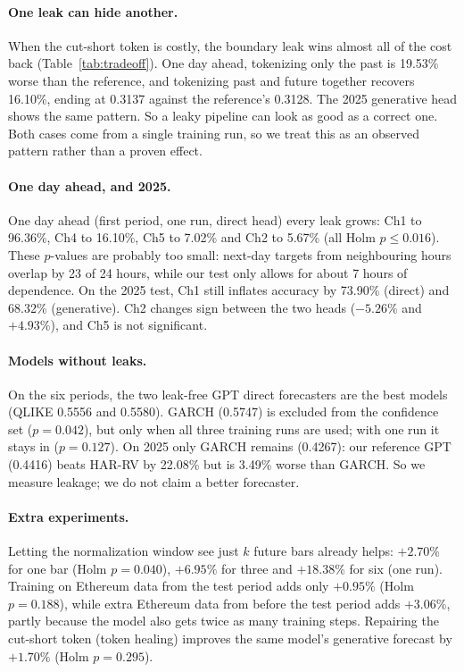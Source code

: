 \documentclass{article}
\begin{document}
\paragraph{One leak can hide another.}
When the cut-short token is costly, the boundary leak wins almost all of the cost back
(Table~\ref{tab:tradeoff}). One day ahead, tokenizing only the past is 19.53\% worse than the
reference, and tokenizing past and future together recovers 16.10\%, ending at 0.3137 against the
reference's 0.3128. The 2025 generative head shows the same pattern. So a leaky pipeline can look as
good as a correct one. Both cases come from a single training run, so we treat this as an observed
pattern rather than a proven effect.

\paragraph{One day ahead, and 2025.}
One day ahead (first period, one run, direct head) every leak grows: Ch1 to 96.36\%, Ch4 to 16.10\%,
Ch5 to 7.02\% and Ch2 to 5.67\% (all Holm $p \le 0.016$). These $p$-values are probably too small:
next-day targets from neighbouring hours overlap by 23 of 24 hours, while our test only allows for
about 7 hours of dependence. On the 2025 test, Ch1 still inflates accuracy by 73.90\% (direct) and
68.32\% (generative). Ch2 changes sign between the two heads ($-5.26\%$ and $+4.93\%$), and Ch5 is not
significant.

\paragraph{Models without leaks.}
On the six periods, the two leak-free GPT direct forecasters are the best models (QLIKE 0.5556 and
0.5580). GARCH (0.5747) is excluded from the confidence set ($p=0.042$), but only when all three
training runs are used; with one run it stays in ($p=0.127$). On 2025 only GARCH remains (0.4267): our
reference GPT (0.4416) beats HAR-RV by 22.08\% but is 3.49\% worse than GARCH. So we measure leakage;
we do not claim a better forecaster.

\paragraph{Extra experiments.}
Letting the normalization window see just $k$ future bars already helps: $+2.70\%$ for one bar (Holm
$p=0.040$), $+6.95\%$ for three and $+18.38\%$ for six (one run). Training on Ethereum data from the
test period adds only $+0.95\%$ (Holm $p=0.188$), while extra Ethereum data from before the test
period adds $+3.06\%$, partly because the model also gets twice as many training steps. Repairing the
cut-short token (token healing) improves the same model's generative forecast by $+1.70\%$ (Holm
$p=0.295$).
\end{document}

